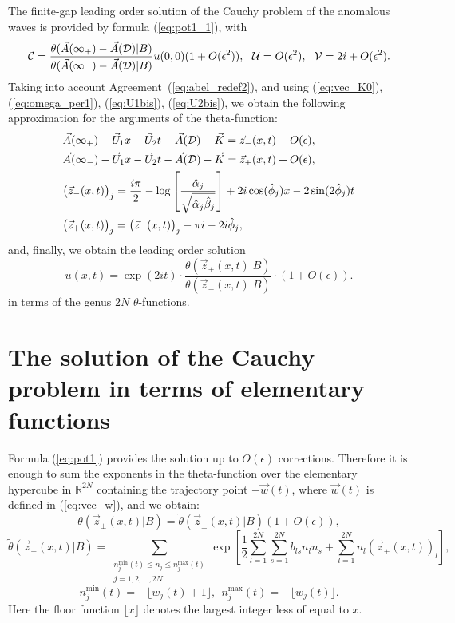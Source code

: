 \documentclass[12pt]{article}
\newcommand{\RR}{\mathbb R}
\newcommand{\DD}{{\cal D}}
\begin{document}
The finite-gap leading order solution of the Cauchy problem of the anomalous waves is provided by formula (\ref{eq:pot1_1}), with
\begin{equation}
\label{eq:pot1_params}
{\cal C} = \frac{\theta(\vec A(\infty_+)-\vec A(\DD)|B)}
{\theta(\vec A(\infty_-)-\vec A(\DD)|B)}  u(0,0)(1+O(\epsilon^2)),\ \ {\cal U} = O(\epsilon^2), \ \ {\cal V} = 2i + O(\epsilon^2).
\end{equation}
Taking into account Agreement~(\ref{eq:abel_redef2}), and using (\ref{eq:vec_K0}), (\ref{eq:omega_per1}),  (\ref{eq:U1bis}), (\ref{eq:U2bis}), we obtain the following approximation for the arguments of the theta-function:
\begin{align}
\label{eq:pot2_params}
&\vec A(\infty_{+}) -\vec U_1 x - \vec U_2 t -\vec A(\DD) -\vec K = \vec z_{-}(x,t)   + O(\epsilon), \nonumber\\
&\vec A(\infty_{-}) -\vec U_1 x - \vec U_2 t -\vec A(\DD) -\vec K  = \vec z_{+}(x,t) + O(\epsilon), \nonumber\\
&\big(\vec z_{-}(x,t)\big)_j =\frac{i\pi}{2}  - \log\left[\frac{\hat\alpha_j}{\sqrt{\hat\alpha_j\hat\beta_j}} \right]  + 2i\cos(\hat\phi_j) x -2\sin(2\hat\phi_j) t \\
&\big(\vec z_{+}(x,t)\big)_j = \big(\vec z_{-}(x,t)\big)_j -\pi i - 2 i \hat\phi_j,
\end{align}
and, finally, we obtain the leading order solution 
\begin{equation}
\label{eq:pot1}
u(x,t)=\exp(2it)\cdot \frac{\theta( \vec z_{+}(x,t)|B)}{\theta(\vec z_{-}(x,t) |B)}\cdot (1+O(\epsilon)).
\end{equation}
in terms of the genus $2N$ $\theta$-functions.

\section{The solution of the Cauchy problem in terms of elementary functions}
\label{sec:sec7}

Formula (\ref{eq:pot1}) provides the solution up to $O(\epsilon)$ corrections. Therefore it is enough to sum the exponents in the theta-function over the elementary hypercube in $\RR^{2N}$ containing the trajectory point $-\vec w(t)$, where  $\vec w(t)$ is defined in (\ref{eq:vec_w}), and we obtain:
$$
\theta(\vec{z}_{\pm}(x,t)|B) = \tilde\theta(\vec{z}_{\pm}(x,t)|B) (1+O(\epsilon)),
$$
\begin{equation}
\label{eq:theta-hyper0}
\tilde\theta(\vec{z}_{\pm} (x, t)|B)= \!\!\!\!\!\!\!\!\!\!\!\!
\sum\limits_{\begin{array}{c}n_j^{\mbox{min}}(t) \le n_j \le n_j^{\mbox{max}}(t)\\ j=1,2,\ldots,2N\end{array}}
 \!\!\!\!\!\!\!\!\!\!\!\!
\exp{\left[\frac{1}{2} \sum\limits_{l=1}^{2N} \sum\limits_{s=1}^{2N} b_{ls}n_ln_s +  \sum\limits_{l=1}^{2N}  n_l (\vec{z}_{\pm}(x,t))_l  \right]},
\end{equation}
$$
n_j^{\mbox{min}}(t) = -\lfloor w_j(t) +1 \rfloor, \ \ n_j^{\mbox{max}}(t) = -\lfloor w_j(t) \rfloor.
$$
Here the floor function $\lfloor x \rfloor$ denotes the largest integer less of equal to $x$.
\end{document}
